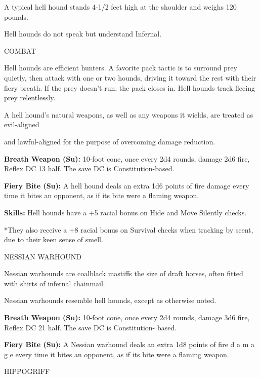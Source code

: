 \documentclass{article}
\begin{document}
A typical hell hound stands 4-1/2 feet high at the shoulder and weighs 120 pounds.

Hell hounds do not speak but understand Infernal.

COMBAT

Hell hounds are efficient hunters. A favorite pack tactic is to surround prey quietly, 
then attack with one or two hounds, driving it toward the rest with their fiery 
breath. If the prey doesn't run, the pack closes in. Hell hounds track fleeing 
prey relentlessly.

A hell hound's natural weapons, as well as any weapons it wields, are treated as 
evil-aligned

and lawful-aligned for the purpose of overcoming damage reduction.

\textbf{Breath Weapon (Su): }10-foot cone, once every 2d4 rounds, damage 2d6 fire, 
Reflex DC 13 half. The save DC is Constitution-based.

\textbf{Fiery Bite (Su):} A hell hound deals an extra 1d6 points of fire damage 
every time it bites an opponent, as if its bite were a flaming weapon.

\textbf{Skills:} Hell hounds have a +5 racial bonus on Hide and Move Silently checks.

*They also receive a +8 racial bonus on Survival checks when tracking by scent, 
due to their keen sense of smell.

\vspace{12pt}
NESSIAN WARHOUND

Nessian warhounds are coalblack mastiffs the size of draft horses, often fitted 
with shirts of infernal chainmail.

Nessian warhounds resemble hell hounds, except as otherwise noted.

\textbf{Breath Weapon (Su): }10-foot cone, once every 2d4 rounds, damage 3d6 fire, 
Reflex DC 21 half. The save DC is Constitution- based.

\textbf{Fiery Bite (Su): }A Nessian warhound deals an extra 1d8 points of fire 
d a m a g e every time it bites an opponent, as if its bite were a flaming weapon. 
 

\vspace{12pt}
{\LARGE{}HIPPOGRIFF}
\end{document}

